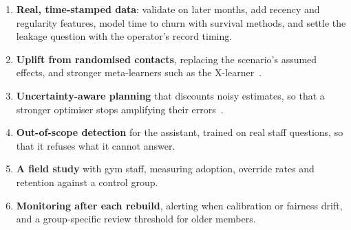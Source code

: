 \begin{enumerate}
  \item \textbf{Real, time-stamped data}: validate on later months, add recency and regularity features, model time to churn with survival methods, and settle the leakage question with the operator's record timing.
  \item \textbf{Uplift from randomised contacts}, replacing the scenario's assumed effects, and stronger meta-learners such as the X-learner~\cite{kunzel2019metalearners}.
  \item \textbf{Uncertainty-aware planning} that discounts noisy estimates, so that a stronger optimiser stops amplifying their errors~\cite{smith2006curse}.
  \item \textbf{Out-of-scope detection} for the assistant, trained on real staff questions, so that it refuses what it cannot answer.
  \item \textbf{A field study} with gym staff, measuring adoption, override rates and retention against a control group.
  \item \textbf{Monitoring after each rebuild}, alerting when calibration or fairness drift, and a group-specific review threshold for older members.
\end{enumerate}
